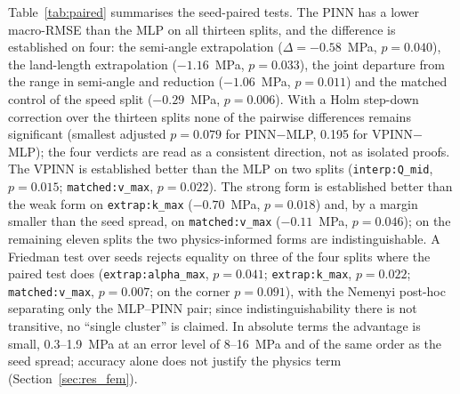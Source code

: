 \documentclass[subscriptcorrection,upint,varvw,barcolor=Goldenrod3,mathalfa=cal=euler,balance,hyphenate,french,pdf-a]{asmejour} %
\begin{document}
Table~\ref{tab:paired} summarises the seed-paired tests. The PINN has a lower macro-RMSE than the MLP on all thirteen splits, and the difference is established on four: the semi-angle extrapolation ($\Delta=-0.58$~MPa, $p=0.040$), the land-length extrapolation ($-1.16$~MPa, $p=0.033$), the joint departure from the range in semi-angle and reduction ($-1.06$~MPa, $p=0.011$) and the matched control of the speed split ($-0.29$~MPa, $p=0.006$). With a Holm step-down correction \citep{holm1979,demsar2006} over the thirteen splits none of the pairwise differences remains significant (smallest adjusted $p = 0.079$ for PINN$-$MLP, 0.195 for VPINN$-$MLP); the four verdicts are read as a consistent direction, not as isolated proofs. %
The VPINN is established better than the MLP on two splits (\texttt{interp:Q\_mid}, $p=0.015$; \texttt{matched:v\_max}, $p=0.022$). The strong form is established better than the weak form on \texttt{extrap:k\_max} ($-0.70$~MPa, $p=0.018$) and, by a margin smaller than the seed spread, on \texttt{matched:v\_max} ($-0.11$~MPa, $p=0.046$); on the remaining eleven splits the two physics-informed forms are indistinguishable. A Friedman test over seeds \citep{friedman1937,demsar2006} rejects equality on three of the four splits where the paired test does (\texttt{extrap:alpha\_max}, $p=0.041$; \texttt{extrap:k\_max}, $p=0.022$; \texttt{matched:v\_max}, $p=0.007$; on the corner $p=0.091$), with the Nemenyi post-hoc separating only the MLP--PINN pair; since indistinguishability there is not transitive, no ``single cluster'' is claimed. In absolute terms the advantage is small, 0.3--1.9~MPa at an error level of 8--16~MPa and of the same order as the seed spread; accuracy alone does not justify the physics term (Section~\ref{sec:res_fem}).
\end{document}
